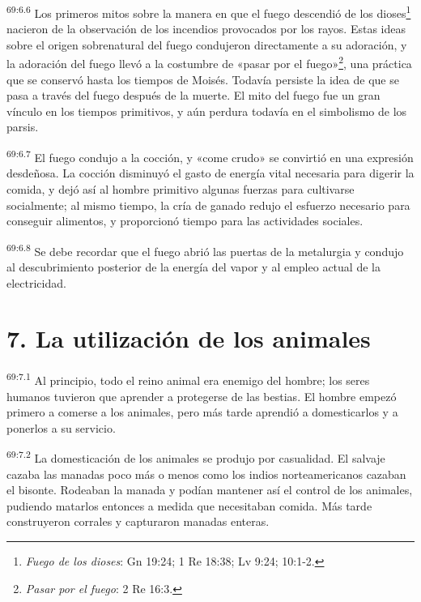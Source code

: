 \par
\textsuperscript{69:6.6} Los primeros mitos sobre la manera en que el fuego descendió de los dioses\footnote{\textit{Fuego de los dioses}: Gn 19:24; 1 Re 18:38; Lv 9:24; 10:1-2.} nacieron de la observación de los incendios provocados por los rayos. Estas ideas sobre el origen sobrenatural del fuego condujeron directamente a su adoración, y la adoración del fuego llevó a la costumbre de «pasar por el fuego»\footnote{\textit{Pasar por el fuego}: 2 Re 16:3.}, una práctica que se conservó hasta los tiempos de Moisés. Todavía persiste la idea de que se pasa a través del fuego después de la muerte. El mito del fuego fue un gran vínculo en los tiempos primitivos, y aún perdura todavía en el simbolismo de los parsis.

\par
\textsuperscript{69:6.7} El fuego condujo a la cocción, y «come crudo» se convirtió en una expresión desdeñosa. La cocción disminuyó el gasto de energía vital necesaria para digerir la comida, y dejó así al hombre primitivo algunas fuerzas para cultivarse socialmente; al mismo tiempo, la cría de ganado redujo el esfuerzo necesario para conseguir alimentos, y proporcionó tiempo para las actividades sociales.

\par
\textsuperscript{69:6.8} Se debe recordar que el fuego abrió las puertas de la metalurgia y condujo al descubrimiento posterior de la energía del vapor y al empleo actual de la electricidad.

\section*{7. La utilización de los animales}
\par
\textsuperscript{69:7.1} Al principio, todo el reino animal era enemigo del hombre; los seres humanos tuvieron que aprender a protegerse de las bestias. El hombre empezó primero a comerse a los animales, pero más tarde aprendió a domesticarlos y a ponerlos a su servicio.

\par
\textsuperscript{69:7.2} La domesticación de los animales se produjo por casualidad. El salvaje cazaba las manadas poco más o menos como los indios norteamericanos cazaban el bisonte. Rodeaban la manada y podían mantener así el control de los animales, pudiendo matarlos entonces a medida que necesitaban comida. Más tarde construyeron corrales y capturaron manadas enteras.

